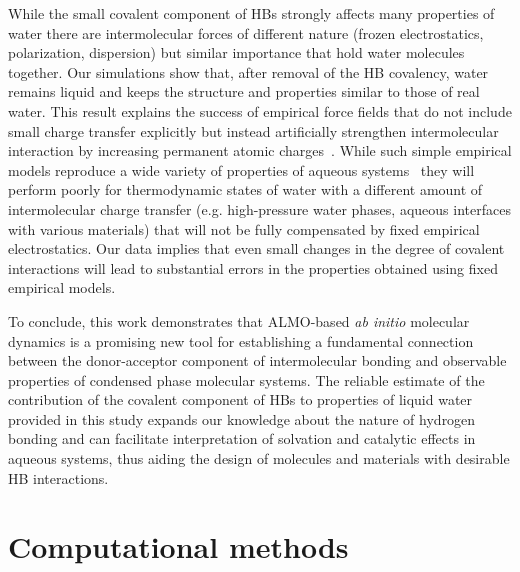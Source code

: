 \documentclass[aps,prl,reprint,amsmath,amssymb]{revtex4-1}
\begin{document}
While the small covalent component of HBs strongly affects many properties of water there are intermolecular forces of different nature (frozen electrostatics, polarization, dispersion) but similar importance that hold water molecules together. 
Our simulations show that, after removal of the HB covalency, water remains liquid and keeps the structure and properties similar to those of real water. 
This result explains the success of empirical force fields that do not include small charge transfer explicitly but instead artificially strengthen intermolecular interaction by increasing permanent atomic charges~\cite{Rick2016}. 
While such simple empirical models reproduce a wide variety of properties of aqueous systems~\cite{vega2011simulating} they will perform poorly for thermodynamic states of water with a different amount of intermolecular charge transfer (e.g. high-pressure water phases, aqueous interfaces with various materials) that will not be fully compensated by fixed empirical electrostatics.
Our data implies that even small changes in the degree of covalent interactions will lead to substantial errors in the properties obtained using fixed empirical models.

To conclude, this work demonstrates that ALMO-based \emph{ab initio} molecular dynamics is a promising new tool for establishing a fundamental connection between the donor-acceptor component of intermolecular bonding and observable properties of condensed phase molecular systems. 
The reliable estimate of the contribution of the covalent component of HBs to properties of liquid water provided in this study expands our knowledge about the nature of hydrogen bonding and can facilitate interpretation of solvation and catalytic effects in aqueous systems, thus aiding the design of molecules and materials with desirable HB interactions. 
 
\section{Computational methods}
\end{document}
